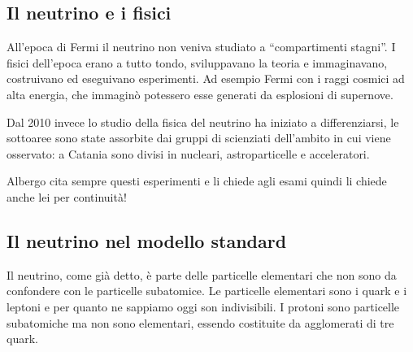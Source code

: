 
    \subsection{Il neutrino e i fisici}
        All'epoca di Fermi il neutrino non veniva studiato a ``compartimenti stagni''. I fisici dell'epoca erano a tutto tondo, sviluppavano la teoria e immaginavano, costruivano ed eseguivano esperimenti. Ad esempio Fermi con i raggi cosmici ad alta energia, che immaginò potessero esse generati da esplosioni di supernove.

        Dal 2010 invece lo studio della fisica del neutrino ha iniziato a differenziarsi, le sottoaree sono state assorbite dai gruppi di scienziati dell'ambito in cui viene osservato: a Catania sono divisi in nucleari, astroparticelle e acceleratori.





        Albergo cita sempre questi esperimenti e li chiede agli esami quindi li chiede anche lei per continuità!
    \subsection{Il neutrino nel modello standard}
        Il neutrino, come già detto, è parte delle particelle elementari che non sono da confondere con le particelle subatomice. Le particelle elementari sono i quark e i leptoni e per quanto ne sappiamo oggi son indivisibili. I protoni sono particelle subatomiche ma non sono elementari, essendo costituite da agglomerati di tre quark.

